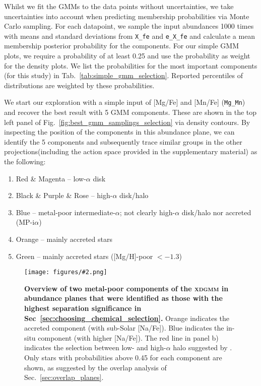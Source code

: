 \documentclass[fleqn,usenatbib]{mnras}
\newcommand{\added}[1]{#1}
\newcommand{\codeicon}{{\faCloudDownload}}
\newcommand{\codelink}[1]{\href{https://github.com/svenbuder/Accreted-stars-in-GALAH-DR3/tree/main/figures/#1.ipynb}{\codeicon}\,\,}
\newcommand{\oscaption}[2]{\caption{#2 \codelink{#1}}}
\newcommand{\figuretextwidth}[4]{\begin{figure*} \centering \texttt{[image: figures/\#2.png]}\oscaption{#3}{#4}\label{fig:#2} \end{figure*}}
\begin{document}
Whilst we fit the GMMs to the data points without uncertainties, we take uncertainties into account when predicting membership probabilities via Monte Carlo sampling. For each datapoint, we sample the input abundances 1000 times with means and standard deviations from \texttt{X\_fe} and \texttt{e\_X\_fe} and calculate a mean membership posterior probability for the components. For our simple GMM plots, we require a probability of at least 0.25 and use the probability as weight for the density plots. We list the probabilities for the most important components (for this study) in Tab.~\ref{tab:simple_gmm_selection}. Reported percentiles of distributions are weighted by these probabilities.

We start our exploration with a simple input of [Mg/Fe] and [Mn/Fe] (\texttt{Mg\_Mn}) and recover the best result with 5 GMM components. These are shown in the top left panel of Fig.~\ref{fig:best_gmm_samplings_selection} via density contours. By inspecting the position of the components in this abundance plane, we can identify the 5 components and subsequently trace similar groups in the other projections\added{(including the action space provided in the supplementary material)} as the following:
\begin{enumerate}
\item Red \& Magenta -- low-$\alpha$ disk
\item Black \& Purple \& Rose -- high-$\alpha$ disk/halo
\item Blue -- metal-poor intermediate-$\alpha$; not clearly high-$\alpha$ disk/halo nor accreted (MP-i$\alpha$)
\item Orange -- mainly accreted stars
 \item Green -- mainly accreted stars ([Mg/H]-poor $< -1.3$)
\end{enumerate}

\figuretextwidth{17cm}{nafe_mgmn_overview}{chronochemodynamic_comparison}{
\textbf{Overview of two metal-poor components of the \textsc{xdgmm} in abundance planes that were identified as those with the highest separation significance in Sec~\ref{sec:choosing_chemical_selection}.}
Orange indicates the accreted component (with sub-Solar [Na/Fe]).
Blue indicates the in-situ component (with higher [Na/Fe]).
The red line in panel b) indicates the selection between low- and high-$\alpha$ halo suggested by \citet{Nissen2010}.
Only stars with probabilities above 0.45 for each component are shown, as suggested by the overlap analysis of Sec.~\ref{sec:overlap_planes}.
}
\end{document}
